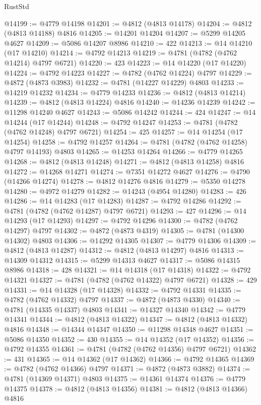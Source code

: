 \begin{lexlean}{RustStd}
\begin{coremodule}
@14199 := @4779 @14198
@14201 := @4812 (@4813 @14178)
@14204 := @4812 (@4813 @14188) @4816
@14205 := @14201 @14204
@14207 := @5299 @14205 @4627
@14209 := @5086 @14207 @8986
@14210 := 422
@14213 := @14 @14210 (@17 @14210)
@14214 := @4792 @14213
@14219 := @4781 (@4782 (@4762 @14214) @4797 @6721)
@14220 := 423
@14223 := @14 @14220 (@17 @14220)
@14224 := @4792 @14223
@14227 := @4782 (@4762 @14224) @4797
@14229 := @4872 (@4873 @3983)
@14232 := @4781 (@14227 @14229) @4803
@14233 := @14219 @14232
@14234 := @4779 @14233
@14236 := @4812 (@4813 @14214)
@14239 := @4812 (@4813 @14224) @4816
@14240 := @14236 @14239
@14242 := @11298 @14240 @4627
@14243 := @5086 @14242
@14244 := 424
@14247 := @14 @14244 (@17 @14244)
@14248 := @4792 @14247
@14253 := @4781 (@4782 (@4762 @14248) @4797 @6721)
@14254 := 425
@14257 := @14 @14254 (@17 @14254)
@14258 := @4792 @14257
@14264 := @4781 (@4782 (@4762 @14258) @4797 @14193) @4803
@14265 := @14253 @14264
@14266 := @4779 @14265
@14268 := @4812 (@4813 @14248)
@14271 := @4812 (@4813 @14258) @4816
@14272 := @14268 @14271
@14274 := @7351 @14272 @4627
@14276 := @4790 (@14266 @14274)
@14278 := @4812 @14276 @4816
@14279 := @5350 @14278
@14280 := @4972 @14279
@14282 := @14243 (@4954 @14280)
@14283 := 426
@14286 := @14 @14283 (@17 @14283)
@14287 := @4792 @14286
@14292 := @4781 (@4782 (@4762 @14287) @4797 @6721)
@14293 := 427
@14296 := @14 @14293 (@17 @14293)
@14297 := @4792 @14296
@14300 := @4782 (@4762 @14297) @4797
@14302 := @4872 (@4873 @4319)
@14305 := @4781 (@14300 @14302) @4803
@14306 := @14292 @14305
@14307 := @4779 @14306
@14309 := @4812 (@4813 @14287)
@14312 := @4812 (@4813 @14297) @4816
@14313 := @14309 @14312
@14315 := @5299 @14313 @4627
@14317 := @5086 @14315 @8986
@14318 := 428
@14321 := @14 @14318 (@17 @14318)
@14322 := @4792 @14321
@14327 := @4781 (@4782 (@4762 @14322) @4797 @6721)
@14328 := 429
@14331 := @14 @14328 (@17 @14328)
@14332 := @4792 @14331
@14335 := @4782 (@4762 @14332) @4797
@14337 := @4872 (@4873 @4330)
@14340 := @4781 (@14335 @14337) @4803
@14341 := @14327 @14340
@14342 := @4779 @14341
@14344 := @4812 (@4813 @14322)
@14347 := @4812 (@4813 @14332) @4816
@14348 := @14344 @14347
@14350 := @11298 @14348 @4627
@14351 := @5086 @14350
@14352 := 430
@14355 := @14 @14352 (@17 @14352)
@14356 := @4792 @14355
@14361 := @4781 (@4782 (@4762 @14356) @4797 @6721)
@14362 := 431
@14365 := @14 @14362 (@17 @14362)
@14366 := @4792 @14365
@14369 := @4782 (@4762 @14366) @4797
@14371 := @4872 (@4873 @3882)
@14374 := @4781 (@14369 @14371) @4803
@14375 := @14361 @14374
@14376 := @4779 @14375
@14378 := @4812 (@4813 @14356)
@14381 := @4812 (@4813 @14366) @4816

\end{coremodule}
\end{lexlean}
